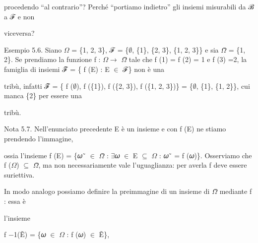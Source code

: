 \documentclass[a4paper,portrait,12pt]{article}
\begin{document}
\begin{flushleft}
procedendo {``}al contrario''? Perch\'{e} {``}portiamo indietro'' gli insiemi misurabili da ℬ a ℱ e non
\end{flushleft}


\begin{flushleft}
viceversa?
\end{flushleft}


\begin{flushleft}
Esempio 5.6. Siano $\Omega$ = \{1, 2, 3\}, ℱ = \{$\emptyset$, \{1\}, \{2, 3\}, \{1, 2, 3\}\} e sia $\Omega$̃ = \{1, 2\}. Se prendiamo la funzione f : $\Omega$$\rightarrow$ $\Omega$̃ tale che f (1) = f (2) = 1 e f (3) =2, la famiglia di insiemi ℱ̃ = \{ f (E) : E $\in$ ℱ\} non \`{e} una
\end{flushleft}


\begin{flushleft}
tribù, infatti ℱ̃ = \{ f ($\emptyset$), f (\{1\}), f (\{2, 3\}), f (\{1, 2, 3\})\} = \{$\emptyset$, \{1\}, \{1, 2\}\}, cui manca \{2\} per essere una
\end{flushleft}


\begin{flushleft}
tribù.
\end{flushleft}


\begin{flushleft}
Nota 5.7. Nell'enunciato precedente E \`{e} un insieme e con f (E) ne stiamo prendendo l'immagine,
\end{flushleft}


\begin{flushleft}
ossia l'insieme f (E) = \{𝜔˜ $\in$ $\Omega$̃ : $\exists$𝜔 $\in$ E $\subseteq$ $\Omega$ : 𝜔˜ = f (𝜔)\}. Osserviamo che f ($\Omega$) $\subseteq$ $\Omega$̃, ma non necessariamente vale l'uguaglianza: per averla f deve essere suriettiva.
\end{flushleft}


\begin{flushleft}
In modo analogo possiamo definire la preimmagine di un insieme di $\Omega$̃ mediante f : essa \`{e}
\end{flushleft}


\begin{flushleft}
l'insieme
\end{flushleft}


\begin{flushleft}
f $-$1(Ẽ) = \{𝜔 $\in$ $\Omega$ : f (𝜔) $\in$ Ẽ\},
\end{flushleft}
\end{document}
